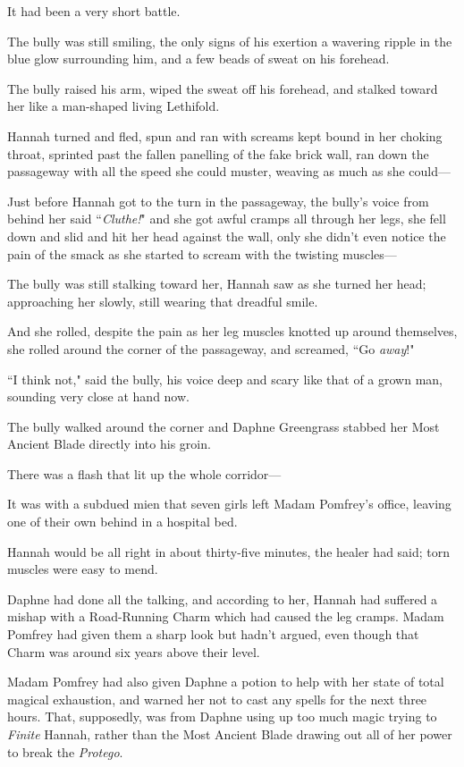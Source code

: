 It had been a very short battle.

The bully was still smiling, the only signs of his exertion a wavering ripple in the blue glow surrounding him, and a few beads of sweat on his forehead.

The bully raised his arm, wiped the sweat off his forehead, and stalked toward her like a man-shaped living Lethifold.

Hannah turned and fled, spun and ran with screams kept bound in her choking throat, sprinted past the fallen panelling of the fake brick wall, ran down the passageway with all the speed she could muster, weaving as much as she could—

Just before Hannah got to the turn in the passageway, the bully's voice from behind her said ``\emph{Cluthe!}" and she got awful cramps all through her legs, she fell down and slid and hit her head against the wall, only she didn't even notice the pain of the smack as she started to scream with the twisting muscles—

The bully was still stalking toward her, Hannah saw as she turned her head; approaching her slowly, still wearing that dreadful smile.

And she rolled, despite the pain as her leg muscles knotted up around themselves, she rolled around the corner of the passageway, and screamed, ``Go \emph{away}!"

``I think not," said the bully, his voice deep and scary like that of a grown man, sounding very close at hand now.

The bully walked around the corner and Daphne Greengrass stabbed her Most Ancient Blade directly into his groin.

There was a flash that lit up the whole corridor—

\later

It was with a subdued mien that seven girls left Madam Pomfrey's office, leaving one of their own behind in a hospital bed.

Hannah would be all right in about thirty-five minutes, the healer had said; torn muscles were easy to mend.

Daphne had done all the talking, and according to her, Hannah had suffered a mishap with a Road-Running Charm which had caused the leg cramps. Madam Pomfrey had given them a sharp look but hadn't argued, even though that Charm was around six years above their level.

Madam Pomfrey had also given Daphne a potion to help with her state of total magical exhaustion, and warned her not to cast any spells for the next three hours. That, supposedly, was from Daphne using up too much magic trying to \emph{Finite} Hannah, rather than the Most Ancient Blade drawing out all of her power to break the \emph{Protego}.

